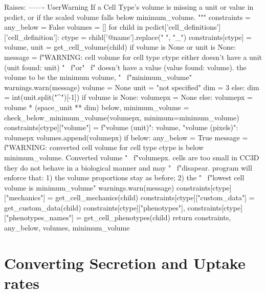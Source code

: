 \begin{python}
    Raises:
    -------
    UserWarning
        If a Cell Type's volume is missing a unit or value in pcdict, or if the scaled volume falls below
        minimum_volume.
    """
    constraints = {}
    any_below = False
    volumes = []
    for child in pcdict['cell_definitions']['cell_definition']:
        ctype = child['@name'].replace(" ", "_")
        constraints[ctype] = {}
        volume, unit = get_cell_volume(child)
        if volume is None or unit is None:
            message = f"WARNING: cell volume for cell type {ctype} either doesn't have a unit \n(unit found: {unit}) " \
                      f"or" \
                      f" doesn't have a value (value found: {volume}). \nSetting the volume to be the minimum volume, " \
                      f"{minimum_volume}"
            warnings.warn(message)
            volume = None
            unit = "not specified"
            dim = 3
        else:
            dim = int(unit.split("^")[-1])
        if volume is None:
            volumepx = None
        else:
            volumepx = volume * (space_unit ** dim)
        below, minimum_volume = check_below_minimum_volume(volumepx, minimum=minimum_volume)
        constraints[ctype]["volume"] = {f"volume ({unit})": volume,
                                        "volume (pixels)": volumepx}
        volumes.append(volumepx)
        if below:
            any_below = True
            message = f"WARNING: converted cell volume for cell type {ctype} is below {minimum_volume}. Converted volume " \
                      f"{volumepx}. \nIf cells are too small in CC3D they do not behave in a biological manner and may " \
                      f"disapear. \nThis program will enforce that: 1) the volume proportions stay as before; 2) the " \
                      f"lowest cell volume is {minimum_volume}"
            warnings.warn(message)
        constraints[ctype]["mechanics"] = get_cell_mechanics(child)
        constraints[ctype]["custom_data"] = get_custom_data(child)
        constraints[ctype]["phenotypes"], constraints[ctype]["phenotypes_names"] = get_cell_phenotypes(child)
    return constraints, any_below, volumes, minimum_volume
\end{python}

\section{Converting Secretion and Uptake rates}\label{appendix:trans:sec-up}

